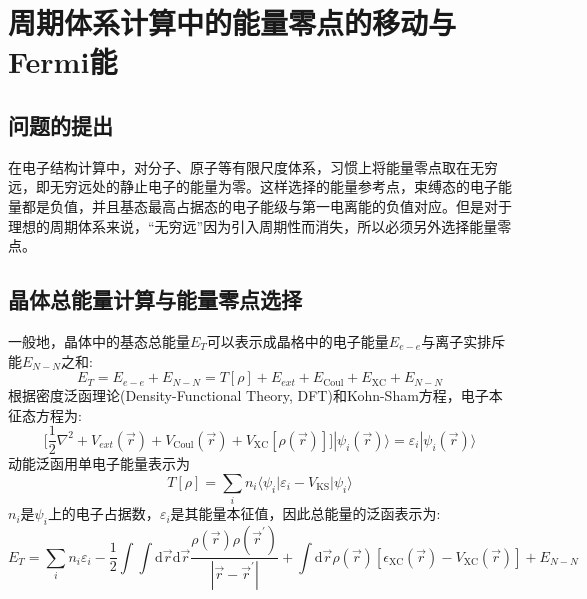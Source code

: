 \section{周期体系计算中的能量零点的移动与\textrm{Fermi}能}
\subsection{问题的提出}
在电子结构计算中，对分子、原子等有限尺度体系，习惯上将能量零点取在无穷远，即无穷远处的静止电子的能量为零。这样选择的能量参考点，束缚态的电子能量都是负值，并且基态最高占据态的电子能级与第一电离能的负值对应。但是对于理想的周期体系来说，“无穷远”因为引入周期性而消失，所以必须另外选择能量零点。

\subsection{晶体总能量计算与能量零点选择}
一般地，晶体中的基态总能量$E_T$可以表示成晶格中的电子能量$E_{e-e}$与离子实排斥能$E_{N-N}$之和:~
	\begin{equation}
		E_T=E_{e-e}+E_{N-N}=T[\rho]+E_{ext}+E_{\mathrm{Coul}}+E_{\mathrm{XC}}+E_{N-N}
		\label{eq:Crystal_ENE_R}
	\end{equation}
根据密度泛函理论(\textrm{Density-Functional Theory, DFT})和\textrm{Kohn-Sham}方程，电子本征态方程为:~
\begin{equation}
	\bigg[\dfrac12\nabla^2+V_{ext}(\vec r)+V_{\mathrm{Coul}}(\vec r)+V_{\mathrm{XC}}[\rho(\vec r)]\bigg]|\psi_i(\vec r)\rangle=\varepsilon_i|\psi_i(\vec r)\rangle
	\label{eq:DFT}
\end{equation}
动能泛函用单电子能量表示为
\begin{equation}
	T[{\rho}]=\sum_in_i\langle\psi_i|\varepsilon_i-V_{\mathrm{KS}}|\psi_i\rangle
	\label{eq:DFT_Kin}
\end{equation}
$n_i$是$\psi_i$上的电子占据数，$\varepsilon_i$是其能量本征值，因此总能量的泛函表示为:
\begin{equation}
	E_T=\sum_in_i\varepsilon_i-\dfrac12\int\int\mathrm{d}\vec r\mathrm{d}\vec r\dfrac{\rho(\vec r)\rho(\vec r^{\prime})}{|\vec r-\vec r^{\prime}|}+\int\mathrm{d}\vec r\rho(\vec r)[\epsilon_{\mathrm{XC}}(\vec r)-V_{\mathrm{XC}}(\vec r)]+E_{N-N}
	\label{eq:DFT_ENE_R}
	\end{equation}


